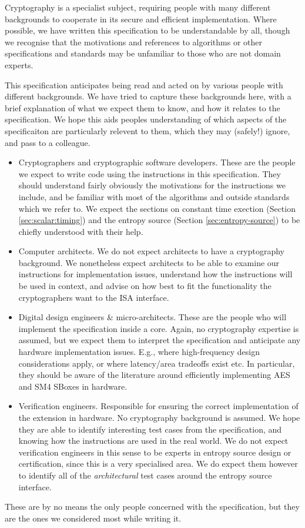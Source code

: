 
Cryptography is a specialist subject, requiring people with many different
backgrounds to cooperate in its secure and efficient implementation.
Where possible, we have written this specification to be understandable by
all, though we recognise that the motivations and references to
algorithms or other specifications and standards may be unfamiliar to those
who are not domain experts.

This specification anticipates being read and acted on by various people
with different backgrounds.
We have tried to capture these backgrounds
here, with a brief explanation of what we expect them to know, and how
it relates to the specification.
We hope this aids peoples understanding of which aspects of the specificaiton
are particularly relevent to them, which they may (safely!) ignore, and
pass to a colleague.

\begin{itemize}
\item Cryptographers and cryptographic software developers.
  These are the people we expect to write code using the instructions
  in this specification.
  They should understand fairly obviously the motivations for the
  instructions we include, and be familiar with most of the algorithms
  and outside standards which we refer to.
  We expect the sections on constant time exection
  (Section \ref{sec:scalar:timing})
  and the entropy source (Section \ref{sec:entropy-source})
  to be chiefly understood with their help.
\item Computer architects.
  We do not expect architects to have a cryptography background.
  We nonetheless expect architects to be able to examine our instructions
  for implementation issues, understand how the instructions will be used
  in context, and advise on how best to fit the functionality the
  cryptographers want to the ISA interface.
\item Digital design engineers \& micro-architects.
  These are the people who will implement the specification inside a
  core. Again, no cryptography expertise is assumed, but we expect them to
  interpret the specification and anticipate any hardware implementation
  issues. E.g., where high-frequency design considerations apply, or where
  latency/area tradeoffs exist etc.
  In particular, they should be aware of the literature around efficiently
  implementing AES and SM4 SBoxes in hardware.
\item Verification engineers.
  Responsible for ensuring the correct implementation of the extension
  in hardware.
  No cryptography background is assumed.
  We hope they are able to identify interesting test cases from the
  specification, and knowing how the instructions are used in the real world.
  We do not expect verification engineers in this sense to be experts
  in entropy source design or certification, since this is a very
  specialised area.
  We do expect them however to identify all of the {\em architectural}
  test cases around the entropy source interface.
\end{itemize}

These are by no means the only people concerned with the specification,
but they are the ones we considered most while writing it.

